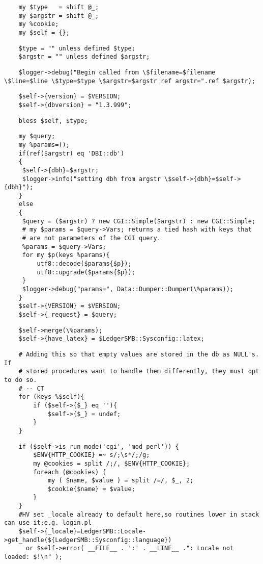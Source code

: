\begin{verbatim}
    my $type   = shift @_;
    my $argstr = shift @_;
    my %cookie;
    my $self = {};
\end{verbatim}
\begin{verbatim}
    $type = "" unless defined $type;
    $argstr = "" unless defined $argstr;
\end{verbatim}
\begin{verbatim}
    $logger->debug("Begin called from \$filename=$filename \$line=$line \$type=$type \$argstr=$argstr ref argstr=".ref $argstr);
\end{verbatim}
\begin{verbatim}
    $self->{version} = $VERSION;
    $self->{dbversion} = "1.3.999";
\end{verbatim}
\begin{verbatim}
    bless $self, $type;
\end{verbatim}
\begin{verbatim}
    my $query;
    my %params=();
    if(ref($argstr) eq 'DBI::db')
    {
     $self->{dbh}=$argstr;
     $logger->info("setting dbh from argstr \$self->{dbh}=$self->{dbh}");
    }
    else
    {
     $query = ($argstr) ? new CGI::Simple($argstr) : new CGI::Simple;
     # my $params = $query->Vars; returns a tied hash with keys that
     # are not parameters of the CGI query.
     %params = $query->Vars;
     for my $p(keys %params){
         utf8::decode($params{$p});
         utf8::upgrade($params{$p});
     }
     $logger->debug("params=", Data::Dumper::Dumper(\%params));
    }
    $self->{VERSION} = $VERSION;
    $self->{_request} = $query;
\end{verbatim}
\begin{verbatim}
    $self->merge(\%params);
    $self->{have_latex} = $LedgerSMB::Sysconfig::latex;
\end{verbatim}
\begin{verbatim}
    # Adding this so that empty values are stored in the db as NULL's.  If
    # stored procedures want to handle them differently, they must opt to do so.
    # -- CT
    for (keys %$self){
        if ($self->{$_} eq ''){
            $self->{$_} = undef;
        }
    }
\end{verbatim}
\begin{verbatim}
    if ($self->is_run_mode('cgi', 'mod_perl')) {
        $ENV{HTTP_COOKIE} =~ s/;\s*/;/g;
        my @cookies = split /;/, $ENV{HTTP_COOKIE};
        foreach (@cookies) {
            my ( $name, $value ) = split /=/, $_, 2;
            $cookie{$name} = $value;
        }
    }
    #HV set _locale already to default here,so routines lower in stack can use it;e.g. login.pl
    $self->{_locale}=LedgerSMB::Locale->get_handle(${LedgerSMB::Sysconfig::language})
      or $self->error( __FILE__ . ':' . __LINE__ .": Locale not loaded: $!\n" );
\end{verbatim}
